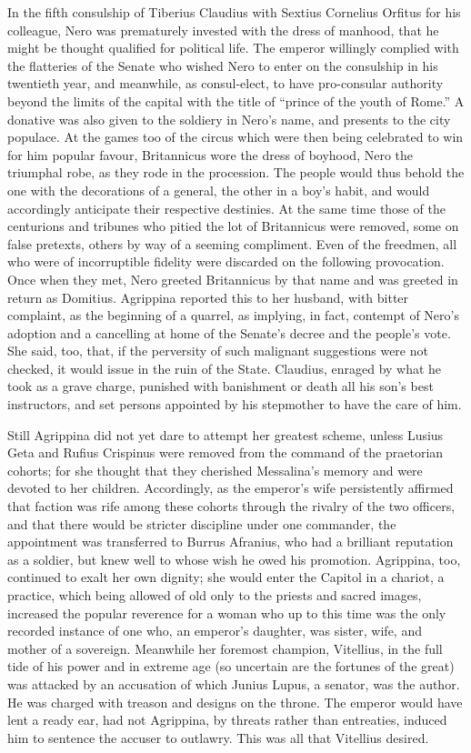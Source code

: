 In the fifth consulship of Tiberius Claudius with Sextius Cornelius Orfitus for his colleague, Nero was prematurely invested with the dress of manhood, that he might be thought qualified for political life. The emperor willingly complied with the flatteries of the Senate who wished Nero to enter on the consulship in his twentieth year, and meanwhile, as consul-elect, to have pro-consular authority beyond the limits of the capital with the title of ``prince of the youth of Rome.'' A donative was also given to the soldiery in Nero's name, and presents to the city populace. At the games too of the circus which were then being celebrated to win for him popular favour, Britannicus wore the dress of boyhood, Nero the triumphal robe, as they rode in the procession. The people would thus behold the one with the decorations of a general, the other in a boy's habit, and would accordingly anticipate their respective destinies. At the same time those of the centurions and tribunes who pitied the lot of Britannicus were removed, some on false pretexts, others by way of a seeming compliment. Even of the freedmen, all who were of incorruptible fidelity were discarded on the following provocation. Once when they met, Nero greeted Britannicus by that name and was greeted in return as Domitius. Agrippina reported this to her husband, with bitter complaint, as the beginning of a quarrel, as implying, in fact, contempt of Nero's adoption and a cancelling at home of the Senate's decree and the people's vote. She said, too, that, if the perversity of such malignant suggestions were not checked, it would issue in the ruin of the State. Claudius, enraged by what he took as a grave charge, punished with banishment or death all his son's best instructors, and set persons appointed by his stepmother to have the care of him.


Still Agrippina did not yet dare to attempt her greatest scheme, unless Lusius Geta and Rufius Crispinus were removed from the command of the praetorian cohorts; for she thought that they cherished Messalina's memory and were devoted to her children. Accordingly, as the emperor's wife persistently affirmed that faction was rife among these cohorts through the rivalry of the two officers, and that there would be stricter discipline under one commander, the appointment was transferred to Burrus Afranius, who had a brilliant reputation as a soldier, but knew well to whose wish he owed his promotion. Agrippina, too, continued to exalt her own dignity; she would enter the Capitol in a chariot, a practice, which being allowed of old only to the priests and sacred images, increased the popular reverence for a woman who up to this time was the only recorded instance of one who, an emperor's daughter, was sister, wife, and mother of a sovereign. Meanwhile her foremost champion, Vitellius, in the full tide of his power and in extreme age (so uncertain are the fortunes of the great) was attacked by an accusation of which Junius Lupus, a senator, was the author. He was charged with treason and designs on the throne. The emperor would have lent a ready ear, had not Agrippina, by threats rather than entreaties, induced him to sentence the accuser to outlawry. This was all that Vitellius desired.

